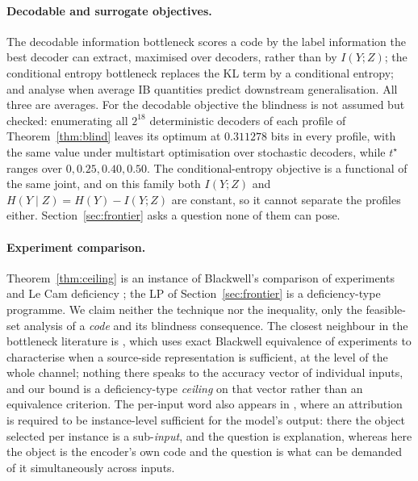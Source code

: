 \documentclass[11pt]{article}
\begin{document}
\paragraph{Decodable and surrogate objectives.} The decodable information bottleneck
\citep{dubois2020} scores a code by the label information the best decoder can extract, maximised
over decoders, rather than by $I(Y;Z)$; the conditional entropy bottleneck \citep{fischer2020}
replaces the KL term by a conditional entropy; and \citet{kawaguchi2023} analyse when average IB
quantities predict downstream generalisation. All three are averages. For the decodable objective
the blindness is not assumed but checked: enumerating all $2^{18}$ deterministic decoders of each
profile of Theorem~\ref{thm:blind} leaves its optimum at $0.311278$ bits in every profile, with the
same value under multistart optimisation over stochastic decoders, while $t^\star$ ranges over
$0,0.25,0.40,0.50$. The conditional-entropy objective is a functional of the same joint, and on this
family both $I(Y;Z)$ and $H(Y\mid Z)=H(Y)-I(Y;Z)$ are constant, so it cannot separate the profiles
either. Section~\ref{sec:frontier} asks a question none of them can pose.
\paragraph{Experiment comparison.} Theorem~\ref{thm:ceiling} is an instance of Blackwell's
comparison of experiments and Le Cam deficiency \citep{raginsky2011,torgersen1991}; the LP of
Section~\ref{sec:frontier} is a deficiency-type programme. We claim neither the technique nor the
inequality, only the feasible-set analysis of a \emph{code} and its blindness consequence. The closest
neighbour in the bottleneck literature is \citet{sourcesuff2024}, which uses exact Blackwell
equivalence of experiments to characterise when a source-side representation is sufficient, at the
level of the whole channel; nothing there speaks to the accuracy vector of individual inputs, and our
bound is a deficiency-type \emph{ceiling} on that vector rather than an equivalence criterion. The
per-input word also appears in \citet{tsib2026}, where an attribution is required to be instance-level
sufficient for the model's output: there the object selected per instance is a sub-\emph{input}, and
the question is explanation, whereas here the object is the encoder's own code and the question is what
can be demanded of it simultaneously across inputs.
\end{document}
